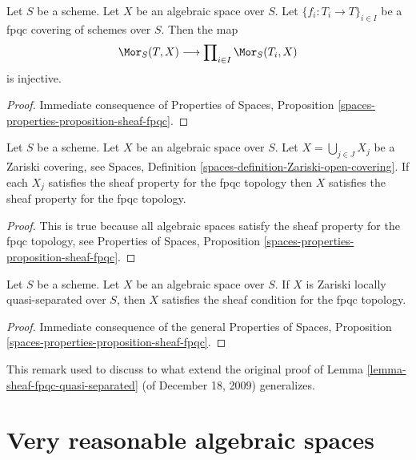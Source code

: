 \begin{lemma}
\label{lemma-separated-fpqc}
Let $S$ be a scheme. Let $X$ be an algebraic space over $S$.
Let $\{f_i : T_i \to T\}_{i \in I}$ be a fpqc covering of schemes over $S$.
Then the map
$$
\Mor_S(T, X)
\longrightarrow
\prod\nolimits_{i \in I} \Mor_S(T_i, X)
$$
is injective.
\end{lemma}

\begin{proof}
Immediate consequence of
Properties of Spaces, Proposition
\ref{spaces-properties-proposition-sheaf-fpqc}.
\end{proof}

\begin{lemma}
\label{lemma-sheaf-fpqc-open-covering}
Let $S$ be a scheme. Let $X$ be an algebraic space over $S$.
Let $X = \bigcup_{j \in J} X_j$ be a Zariski covering, see
Spaces, Definition \ref{spaces-definition-Zariski-open-covering}.
If each $X_j$ satisfies the sheaf property for the fpqc topology
then $X$ satisfies the sheaf property for the fpqc topology.
\end{lemma}

\begin{proof}
This is true because all algebraic spaces satisfy the sheaf property
for the fpqc topology, see
Properties of Spaces, Proposition
\ref{spaces-properties-proposition-sheaf-fpqc}.
\end{proof}

\begin{lemma}
\label{lemma-sheaf-fpqc-quasi-separated}
Let $S$ be a scheme. Let $X$ be an algebraic space over $S$.
If $X$ is Zariski locally quasi-separated over $S$, then $X$ satisfies
the sheaf condition for the fpqc topology.
\end{lemma}

\begin{proof}
Immediate consequence of the general
Properties of Spaces, Proposition
\ref{spaces-properties-proposition-sheaf-fpqc}.
\end{proof}

\begin{remark}
\label{remark-proof-works-when}
This remark used to discuss to what extend the original proof of
Lemma \ref{lemma-sheaf-fpqc-quasi-separated} (of December 18, 2009)
generalizes.
\end{remark}






\section{Very reasonable algebraic spaces}
\label{section-very-reasonable}

